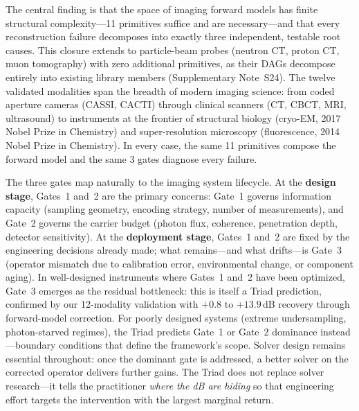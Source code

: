\documentclass[11pt]{article}
\begin{document}
The central finding is that the space of imaging forward models has finite structural complexity---11 primitives suffice and are necessary---and that every reconstruction failure decomposes into exactly three independent, testable root causes. This closure extends to particle-beam probes (neutron CT, proton CT, muon tomography) with zero additional primitives, as their DAGs decompose entirely into existing library members (Supplementary Note~S24). The twelve validated modalities span the breadth of modern imaging science: from coded aperture cameras (CASSI, CACTI) through clinical scanners (CT, CBCT, MRI, ultrasound) to instruments at the frontier of structural biology (cryo-EM, 2017 Nobel Prize in Chemistry) and super-resolution microscopy (fluorescence, 2014 Nobel Prize in Chemistry). In every case, the same 11 primitives compose the forward model and the same 3 gates diagnose every failure.

The three gates map naturally to the imaging system lifecycle. At the \textbf{design stage}, Gates~1 and~2 are the primary concerns: Gate~1 governs information capacity (sampling geometry, encoding strategy, number of measurements), and Gate~2 governs the carrier budget (photon flux, coherence, penetration depth, detector sensitivity). At the \textbf{deployment stage}, Gates~1 and~2 are fixed by the engineering decisions already made; what remains---and what drifts---is Gate~3 (operator mismatch due to calibration error, environmental change, or component aging). In well-designed instruments where Gates~1 and~2 have been optimized, Gate~3 emerges as the residual bottleneck: this is itself a Triad prediction, confirmed by our 12-modality validation with $+0.8$ to $+13.9$\,dB recovery through forward-model correction. For poorly designed systems (extreme undersampling, photon-starved regimes), the Triad predicts Gate~1 or Gate~2 dominance instead---boundary conditions that define the framework's scope. Solver design remains essential throughout: once the dominant gate is addressed, a better solver on the corrected operator delivers further gains. The Triad does not replace solver research---it tells the practitioner \emph{where the dB are hiding} so that engineering effort targets the intervention with the largest marginal return.
\end{document}
